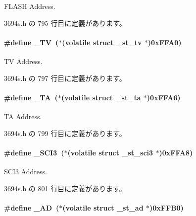 F\+L\+A\+S\+H Address. 



 3694s.\+h の 795 行目に定義があります。

\paragraph[{\+\_\+\+T\+V}]{\setlength{\rightskip}{0pt plus 5cm}\#define \+\_\+\+T\+V~($\ast$(volatile struct {\bf \+\_\+st\+\_\+tv}    $\ast$)0x\+F\+F\+A0)}\label{3694s_8h_a24911c04138634483957813aac79f176_a24911c04138634483957813aac79f176}


T\+V Address. 



 3694s.\+h の 797 行目に定義があります。

\paragraph[{\+\_\+\+T\+A}]{\setlength{\rightskip}{0pt plus 5cm}\#define \+\_\+\+T\+A~($\ast$(volatile struct {\bf \+\_\+st\+\_\+ta}    $\ast$)0x\+F\+F\+A6)}\label{3694s_8h_a939a2391f69f646cdec38c24f3e8a18b_a939a2391f69f646cdec38c24f3e8a18b}


T\+A Address. 



 3694s.\+h の 799 行目に定義があります。

\paragraph[{\+\_\+\+S\+C\+I3}]{\setlength{\rightskip}{0pt plus 5cm}\#define \+\_\+\+S\+C\+I3~($\ast$(volatile struct {\bf \+\_\+st\+\_\+sci3}  $\ast$)0x\+F\+F\+A8)}\label{3694s_8h_a0c04ae9a6046afaa267361219131972b_a0c04ae9a6046afaa267361219131972b}


S\+C\+I3 Address. 



 3694s.\+h の 801 行目に定義があります。

\paragraph[{\+\_\+\+A\+D}]{\setlength{\rightskip}{0pt plus 5cm}\#define \+\_\+\+A\+D~($\ast$(volatile struct {\bf \+\_\+st\+\_\+ad}    $\ast$)0x\+F\+F\+B0)}\label{3694s_8h_a38dccac05b70940cc39e5a5b20badfce_a38dccac05b70940cc39e5a5b20badfce}


